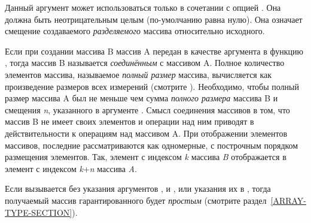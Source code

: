 \begin{defun}[Функция]
\begin{flushdesc}
\item[\cd{:displaced-index-offset}]
Данный аргумент может использоваться только в сочетании с опцией
.
Она должна быть неотрицательным целым (по-умолчанию равна нулю). Она означает
смещение создаваемого \emph{разделяемого} массива относительно исходного.

Если при создании массива B массив A передан в качестве аргумента
 в функцию , тогда массив B называется
\emph{соединённым} с массивом A. Полное количество элементов массива, называемое
\emph{полный размер} массива, вычисляется как произведение размеров всех
измерений (смотрите ).
Необходимо, чтобы полный размер массива A был не меньше чем сумма \emph{полного
  размера} массива B и смещения \emph{n}, указанного в аргументе
.
Смысл соединения массивов в том, что массив B не имеет своих элементов и
операции над ним приводят в действительности к операциям над массивом A.
При отображении элементов массивов, последние рассматриваются как одномерные, с
построчным порядком размещения элементов.
Так, элемент с индексом \emph{k} массива \emph{B} отображается в элемент с
индексом \emph{k}+\emph{n} массива \emph{A}.
\end{flushdesc}

Если  вызывается без указания аргументов ,
 и , или указания их в {\nil}, тогда
получаемый массив гарантированного будет \emph{простым} (смотрите
раздел~\ref{ARRAY-TYPE-SECTION}). 


\end{defun}
